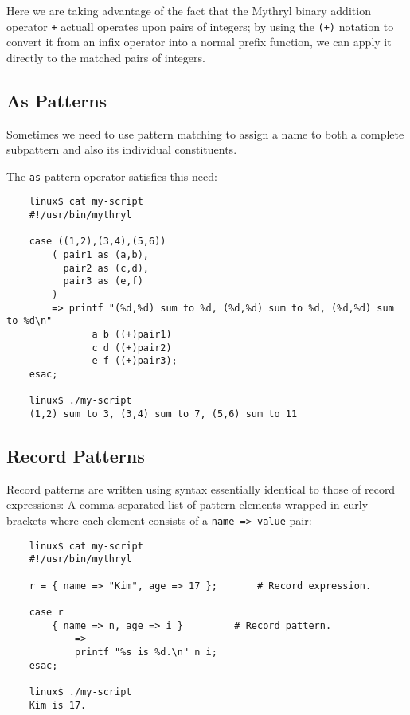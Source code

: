 Here we are taking advantage of the fact that the Mythryl 
binary addition operator {\tt +} actuall operates upon 
pairs of integers;  by using the {\tt (+)} notation to 
convert it from an infix operator into a normal prefix 
function, we can apply it directly to the matched pairs 
of integers.

\cutend*

\subsection{As Patterns}
\label{section:ref:case-expressions-and-pattern-matching:as-patterns}

Sometimes we need to use pattern matching to assign a name to 
both a complete subpattern and also its individual constituents.

The {\tt as} pattern operator satisfies this need:

\begin{verbatim}
    linux$ cat my-script
    #!/usr/bin/mythryl

    case ((1,2),(3,4),(5,6))
        ( pair1 as (a,b),
          pair2 as (c,d),
          pair3 as (e,f)
        )
        => printf "(%d,%d) sum to %d, (%d,%d) sum to %d, (%d,%d) sum to %d\n"
               a b ((+)pair1)
               c d ((+)pair2)
               e f ((+)pair3);
    esac;

    linux$ ./my-script
    (1,2) sum to 3, (3,4) sum to 7, (5,6) sum to 11
\end{verbatim}

\cutend*




\subsection{Record Patterns}
\label{section:ref:case-expressions-and-pattern-matching:record-patterns}

Record patterns are written using syntax 
essentially identical to those of record expressions:  A 
comma-separated list of pattern elements wrapped in curly brackets 
where each element consists of a {\tt name => value} pair:

\begin{verbatim}
    linux$ cat my-script
    #!/usr/bin/mythryl

    r = { name => "Kim", age => 17 };		# Record expression.

    case r
        { name => n, age => i }			# Record pattern.
            =>
            printf "%s is %d.\n" n i;
    esac;

    linux$ ./my-script
    Kim is 17.
\end{verbatim}

